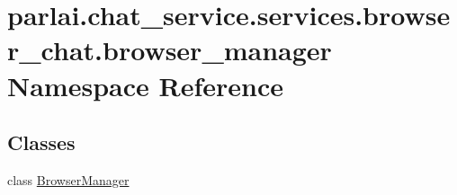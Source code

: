 \hypertarget{namespaceparlai_1_1chat__service_1_1services_1_1browser__chat_1_1browser__manager}{}\section{parlai.\+chat\+\_\+service.\+services.\+browser\+\_\+chat.\+browser\+\_\+manager Namespace Reference}
\label{namespaceparlai_1_1chat__service_1_1services_1_1browser__chat_1_1browser__manager}
\subsection*{Classes}
\begin{DoxyCompactItemize}
\item 
class \hyperlink{classparlai_1_1chat__service_1_1services_1_1browser__chat_1_1browser__manager_1_1BrowserManager}{Browser\+Manager}
\end{DoxyCompactItemize}
